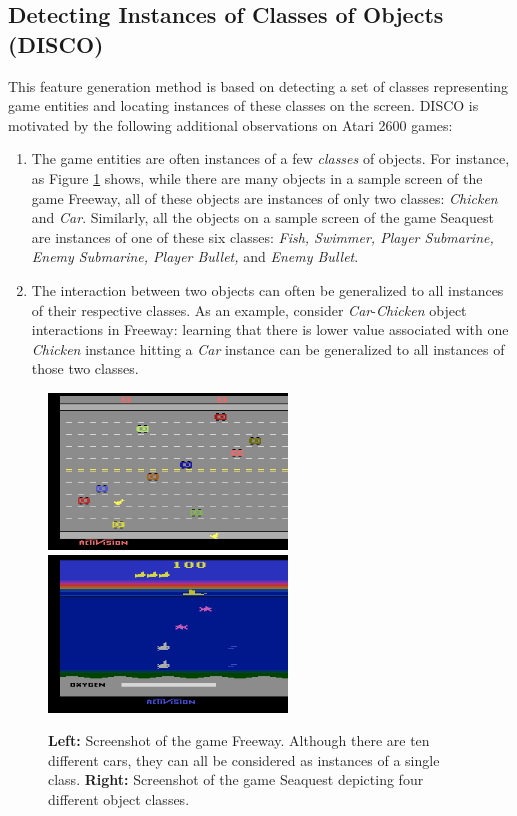 \documentclass[twoside,11pt]{article}
\newcommand{\gamename}[1]{{\sc #1}}
\begin{document}
\subsection{Detecting Instances of Classes of Objects (DISCO)}
\label{sec:agents:rl:disco}
This feature generation method is based on detecting a set of classes representing game entities and locating instances of these classes on the screen. DISCO is motivated by the following additional observations on Atari 2600 games:
\begin{enumerate}
	\item The game entities are often instances of a few \emph{classes} of objects. For instance, as Figure \ref{fig:agents:rl:disco:screenshot} shows, while there are many objects in a sample screen of the game \gamename{Freeway}, all of these objects are instances of only two classes: \emph{Chicken} and \emph{Car}. Similarly, all the objects on a sample screen of the game \gamename{Seaquest} are instances of one of these six classes: \emph{Fish, Swimmer, Player Submarine, Enemy Submarine, Player Bullet,} and \emph{Enemy Bullet}. 
	\item The interaction between two objects can often be generalized to all instances of their respective classes. As an example, consider \emph{Car}-\emph{Chicken} object interactions in \gamename{Freeway}: learning that there is lower value associated with one \emph{Chicken} instance hitting a \emph{Car} instance can be generalized to all instances of those two classes. 
\end{enumerate}

\begin{figure}[htb]
\begin{center}
\includegraphics[width=2.5in]{images/freeway_screen.png}
\includegraphics[width=2.5in]{images/seaquest_screen.png}
\caption{\textbf{Left:} Screenshot of the game \gamename{Freeway}. Although there are ten different cars, they can all be considered as instances of a single class. \textbf{Right:} Screenshot of the game \gamename{Seaquest} depicting four different object classes.\label{fig:agents:rl:disco:screenshot}}
\end{center}
\end{figure}
\end{document}
